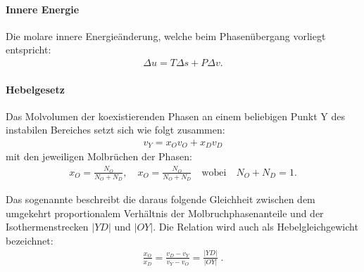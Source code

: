 \paragraph*{Innere Energie}
Die molare innere Energieänderung, welche beim Phasenübergang vorliegt entspricht:
\begin{align*}
    \Delta u=T\Delta s+P\Delta v.
\end{align*}

\paragraph*{Hebelgesetz}
Das Molvolumen der koexistierenden Phasen an einem beliebigen Punkt Y des instabilen Bereiches %
setzt sich wie folgt zusammen:
\begin{align*}
    v_Y=x_Ov_O+x_Dv_D
\end{align*}
mit den jeweiligen Molbrüchen der Phasen:
\begin{align*}
    x_O=\frac{N_O}{N_O+N_D}, \quad x_O=\frac{N_O}{N_O+N_D} \quad \mathrm{wobei} \quad N_O+N_D=1.
\end{align*}
\begin{formal}
  Das sogenannte  beschreibt die daraus folgende Gleichheit zwischen dem umgekehrt proportionalem Verhältnis der Molbruchphasenanteile und der Isothermenstrecken $|YD|$ und $|OY|$. Die Relation wird auch als Hebelgleichgewicht bezeichnet:
    \begin{align*}
        \boxed{\frac{x_O}{x_D}=\frac{v_D-v_Y}{v_Y-v_O}=\frac{|YD|}{|OY|}}\;.
    \end{align*}
\end{formal}


